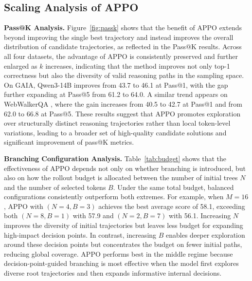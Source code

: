 \documentclass{article}
\begin{document}
\vspace{-0.3cm}
\subsection{Scaling Analysis of APPO}

\noindent\textbf{Pass@K Analysis.} 
Figure~\ref{fig:passk} shows that the benefit of APPO extends beyond improving the single best trajectory and instead improves the overall distribution of candidate trajectories, as reflected in the Pass@K results. Across all four datasets, the advantage of APPO is consistently preserved and further enlarged as $k$ increases, indicating that the method improves not only top-1 correctness but also the diversity of valid reasoning paths in the sampling space. On GAIA, Qwen3-14B improves from 43.7 to 46.1 at Pass@1, with the gap further expanding at Pass@5 from 61.2 to 64.0. A similar trend appears on WebWalkerQA , where the gain increases from 40.5 to 42.7 at Pass@1 and from 62.0 to 66.8 at Pass@5. These results suggest that APPO promotes exploration over structurally distinct reasoning trajectories rather than local token-level variations, leading to a broader set of high-quality candidate solutions and significant improvement of pass@K metrics.

\noindent\textbf{Branching Configuration Analysis.} 
Table~\ref{tab:budget} shows that the effectiveness of APPO depends not only on whether branching is introduced, but also on how the rollout budget is allocated between the number of initial trees $N$ and the number of selected tokens $B$. 
Under the same total budget, balanced configurations consistently outperform both extremes. 
For example, when $M=16$, APPO with $(N=4, B=3)$ achieves the best average score of 58.1, exceeding both $(N=8, B=1)$ with 57.9 and $(N=2, B=7)$ with 56.1. 
Increasing $N$ improves the diversity of initial trajectories but leaves less budget for expanding high-impact decision points. 
In contrast, increasing $B$ enables deeper exploration around these decision points but concentrates the budget on fewer initial paths, reducing global coverage. 
APPO performs best in the middle regime because decision-point-guided branching is most effective when the model first explores diverse root trajectories and then expands informative internal decisions.
\end{document}
